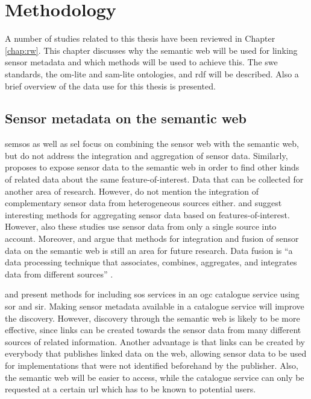 


\chapter{Methodology}
\label{chap:methods}

A number of studies related to this thesis have been reviewed in Chapter \ref{chap:rw}. This chapter discusses why the semantic web will be used for linking sensor metadata and which methods will be used to achieve this. The \ac{swe} standards, the om-lite and sam-lite ontologies, and \ac{rdf} will be described. Also a brief overview of the data use for this thesis is presented.   

\section{Sensor metadata on the semantic web}
\ac{semsos} \citep{SSW:Henson, SSW:Pschorr} as well as \ac{sel} \citep{SSW:Janowicz} focus on combining the sensor web with the semantic web, but do not address the integration and aggregation of sensor data. Similarly, \cite{SSW:Atkinson} proposes to expose sensor data to the semantic web in order to find other kinds of related data about the same feature-of-interest. Data that can be collected for another area of research. However, \cite{SSW:Atkinson} do not mention the integration of complementary sensor data from heterogeneous sources either. \cite{SSW:Stasch} and \cite{SSW:Stasch3} suggest interesting methods for aggregating sensor data based on features-of-interest. However, also these studies use sensor data from only a single source into account. Moreover, \cite{SSW:Corcho} and \cite{SSW:Ji} argue that methods for integration and fusion of sensor data on the semantic web is still an area for future research. Data fusion is \enquote{a data processing technique that associates, combines, aggregates, and integrates data from different sources} \cite[p. 2]{SSW:Wang2}. 

\cite{SW:OGC3} and \cite{SW:OGC4} present methods for including \ac{sos} services in an \ac{ogc} catalogue service using \ac{sor} and \ac{sir}. Making sensor metadata available in a catalogue service will improve the discovery. However, discovery through the semantic web is likely to be more effective, since links can be created towards the sensor data from many different sources of related information. Another advantage is that links can be created by everybody that publishes linked data on the web, allowing sensor data to be used for implementations that were not identified beforehand by the publisher. Also, the semantic web will be easier to access, while the catalogue service can only be requested at a certain \ac{url} which has to be known to potential users. 

